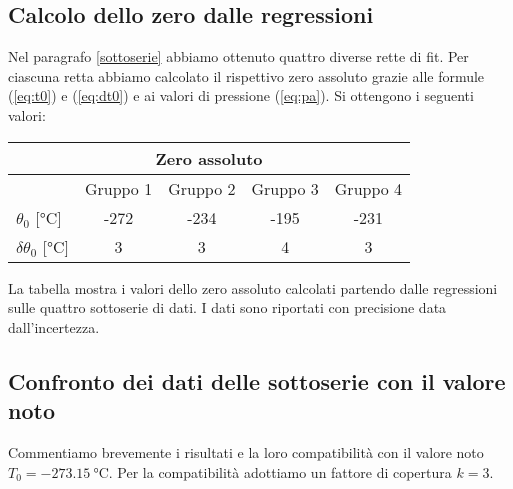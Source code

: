 \subsection{Calcolo dello zero dalle regressioni}

Nel paragrafo {\ref{sottoserie}} abbiamo ottenuto quattro diverse rette di fit. Per ciascuna retta abbiamo calcolato
il rispettivo zero assoluto grazie alle formule (\ref{eq:t0}) e (\ref{eq:dt0}) e ai valori di pressione (\ref{eq:pa}). Si ottengono i seguenti
valori:

\begin{center}
    \begin{tabular}{l c c c c}
        \multicolumn{5}{c}{\textbf{Zero assoluto}} \\
        \toprule
        & Gruppo 1 & Gruppo 2 & Gruppo 3 & Gruppo 4 \\
        \midrule
        $\theta_0$ [\si{\celsius}] & -272 & -234 & -195 & -231 \\
        $\delta \theta_0$ [\si{\celsius}] & 3 & 3 & 4 & 3 \\
        \bottomrule
    \end{tabular}
\end{center}

La tabella mostra i valori dello zero assoluto calcolati partendo dalle regressioni sulle quattro sottoserie di dati.
I dati sono riportati con precisione data dall'incertezza.
  
\subsection{Confronto dei dati delle sottoserie con il valore noto}

Commentiamo brevemente i risultati e la loro compatibilità
con il valore noto $T_0 = \SI{-273.15}{\celsius}$. Per la compatibilità adottiamo un fattore di copertura $k = 3$.


